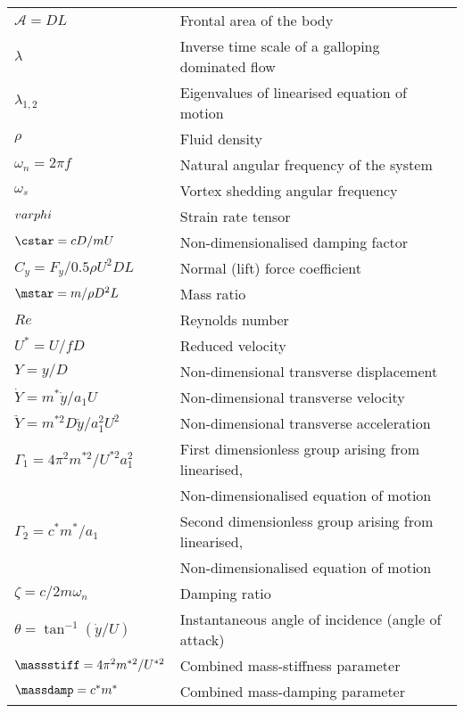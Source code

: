 \begin{longtable}{p{}p{}}
$\mathcal{A}=DL$ & Frontal area of the body\\ 
$\lambda$ & Inverse time scale of a galloping dominated flow \\
$\lambda_{1,2}$ & Eigenvalues of linearised equation of motion \\
$\rho$ & Fluid density  \\
$\omega_n= 2 \pi f$ & Natural angular frequency of the system  \\
$\omega_s$ & Vortex shedding angular frequency \\
$\\varphi$ & Strain rate tensor \\
$\cstar=cD/mU$ & Non-dimensionalised damping factor \\
$C_y=F_y/0.5\rho U^2DL$ & Normal (lift) force coefficient \\
$\mstar=m/\rho D^2L$ & Mass ratio \\
$Re$ & Reynolds number  \\
$U^*=U/fD$ & Reduced velocity  \\
$Y=y/D$ & Non-dimensional transverse displacement \\
$\dot{Y}=m^*\dot{y}/a_1U$ & Non-dimensional transverse velocity \\
$\ddot{Y}=m^{*2}D\ddot{y}/a_1^2U^2$ & Non-dimensional transverse acceleration \\
$\Gamma_1 = 4\pi^2m^{*2}/U^{*2}a_1^2$ & First dimensionless group arising from linearised,\\ 
& Non-dimensionalised equation of motion\\
$\Gamma_2 = c^*m^*/a_1$ & Second dimensionless group arising from linearised,\\
& Non-dimensionalised equation of motion \\
$\zeta= c/2 m \omega_n$ & Damping ratio \\
$\theta= \tan^{-1}{(\dot{y}/U)}$ & Instantaneous angle of incidence (angle of attack)\\
$\massstiff =  4\pi^2m^{*2}/U^{*2}$ & Combined mass-stiffness parameter\\
$\massdamp = c^*m^*$ & Combined mass-damping parameter\\
\end{longtable} 